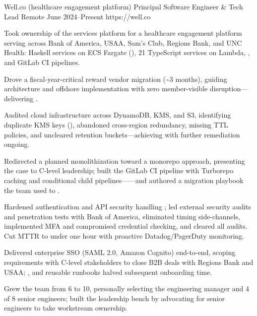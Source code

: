 
\begin{cventries}

\jobentry
  {Well.co (healthcare engagement platform)} %
  {Principal Software Engineer \& Tech Lead} %
  {Remote} %
  {June 2024--Present} %
  {https://well.co} %
  {
    \begin{cvitems}
      \item{Took ownership of the services platform for a healthcare engagement platform serving  across Bank of America, USAA, Sam's Club, Regions Bank, and UNC Health: Haskell services on ECS Fargate (), 21 TypeScript services on Lambda, , and GitLab CI pipelines.}
      \item{Drove a fiscal-year-critical reward vendor migration (\textasciitilde{}3 months), guiding architecture and offshore implementation with zero member-visible disruption---delivering .}
      \item{Audited cloud infrastructure across DynamoDB, KMS, and S3, identifying duplicate KMS keys (), abandoned cross-region redundancy, missing TTL policies, and uncleared retention buckets---achieving  with further remediation ongoing.}
      \item{Redirected a planned monolithization toward a monorepo approach, presenting the case to C-level leadership; built the GitLab CI pipeline with Turborepo caching and conditional child pipelines------and authored a migration playbook the team used to .}
      \item{Hardened authentication and API security handling ; led external security audits and penetration tests with Bank of America, eliminated timing side-channels, implemented MFA and compromised credential checking, and cleared all audits. Cut MTTR to under one hour with proactive Datadog/PagerDuty monitoring.}
      \item{Delivered enterprise SSO (SAML 2.0, Amazon Cognito) end-to-end, scoping requirements with C-level stakeholders to close B2B deals with Regions Bank and USAA; , and reusable runbooks halved subsequent onboarding time.}
      \item{Grew the team from 6 to 10, personally selecting the engineering manager and 4 of 8 senior engineers; built the leadership bench by advocating for senior engineers to take workstream ownership.}
    \end{cvitems}
  }


\end{cventries}
